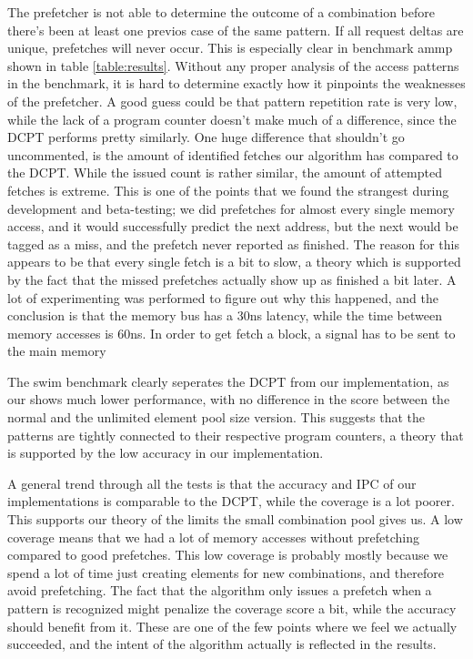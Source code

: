 The prefetcher is not able to determine the outcome of a combination before there's been at least one previos case of the same pattern. If all request deltas are unique, prefetches will never occur. This is especially clear in benchmark ammp shown in table \ref{table:results}. Without any proper analysis of the access patterns in the benchmark, it is hard to determine exactly how it pinpoints the weaknesses of the prefetcher. A good guess could be that pattern repetition rate is very low, while the lack of a program counter doesn't make much of a difference, since the DCPT performs pretty similarly. One huge difference that shouldn't go uncommented, is the amount of identified fetches our algorithm has compared to the DCPT. While the issued count is rather similar, the amount of attempted fetches is extreme. This is one of the points that we found the strangest during development and beta-testing; we did prefetches for almost every single memory access, and it would successfully predict the next address, but the next would be tagged as a miss, and the prefetch never reported as finished. The reason for this appears to be that every single fetch is a bit to slow, a theory which is supported by the fact that the missed prefetches actually show up as finished a bit later. A lot of experimenting was performed to figure out why this happened, and the conclusion is that the memory bus has a 30ns latency, while the time between memory accesses is 60ns. In order to get fetch a block, a signal has to be sent to the main memory

The swim benchmark clearly seperates the DCPT from our implementation, as our shows much lower performance, with no difference in the score between the normal and the unlimited element pool size version. This suggests that the patterns are tightly connected to their respective program counters, a theory that is supported by the low accuracy in our implementation.

A general trend through all the tests is that the accuracy and IPC of our implementations is comparable to the DCPT, while the coverage is a lot poorer. This supports our theory of the limits the small combination pool gives us. A low coverage means that we had a lot of memory accesses without prefetching compared to good prefetches. This low coverage is probably mostly because we spend a lot of time just creating elements for new combinations, and therefore avoid prefetching. The fact that the algorithm only issues a prefetch when a pattern is recognized might penalize the coverage score a bit, while the accuracy should benefit from it. These are one of the few points where we feel we actually succeeded, and the intent of the algorithm actually is reflected in the results. 



%
%
%
